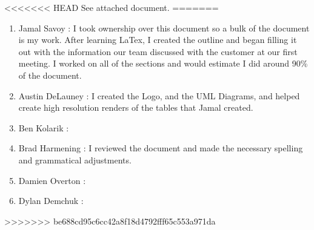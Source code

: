 \documentclass{article}
\begin{document}
\vspace{2.5mm}

\begin{addmargin}[2em]{0em}

<<<<<<< HEAD
See attached document.
=======
\begin{enumerate}

\item Jamal Savoy : I took ownership over this document so a bulk of the document is my work. After learning LaTex, I created the outline and began filling it out with the information our team discussed with the customer at our first meeting. I worked on all of the sections and would estimate I did around 90\% of the document.

\item Austin DeLauney : I created the Logo, and the UML Diagrams, and helped create high resolution renders of the tables that Jamal created.

\item Ben Kolarik : 

\item Brad Harmening : I reviewed the document and made the necessary spelling and grammatical adjustments.

\item Damien Overton : 

\item Dylan Demchuk : 

\end{enumerate}
>>>>>>> be688cd95c6cc42a8f18d4792fff65c553a971da
\end{addmargin}
\end{document}
